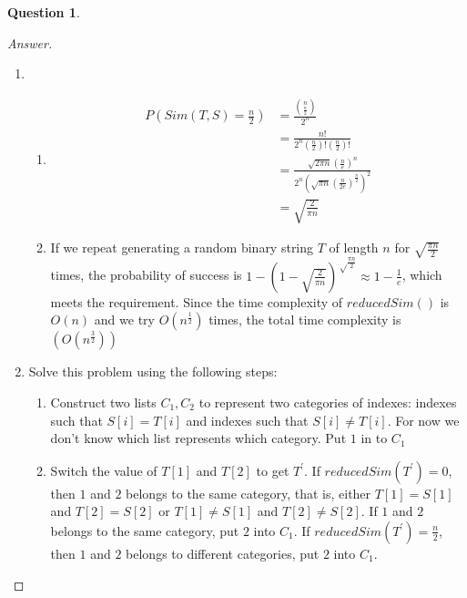 \documentclass{article}
\theoremstyle{plain}
\newtheorem{question}{Question}
\newenvironment{answer}[1][Answer]
    {\begin{proof}[#1]{$ $}\renewcommand\qedsymbol{$\vartriangle$}}
    {\end{proof}}
\begin{document}
\begin{question}
\end{question}
\begin{answer}
    \begin{enumerate}
        \item
        \begin{enumerate}
            \item
            \begin{equation*}
                \begin{aligned}
                    P\left(Sim(T, S)= \frac{n}{2}\right) &= \frac{\binom{n}{\frac{n}{2}}}{2^n} \\
                    &= \frac{n!}{2^n (\frac{n}{2})!(\frac{n}{2})!} \\
                    &= \frac{\sqrt{2 \pi n} (\frac{n}{e})^n}{2^n \left(\sqrt{\pi n} (\frac{n}{2e})^\frac{n}{2}\right)^2} \\
                    &= \sqrt{\frac{2}{\pi n}}
                \end{aligned}
            \end{equation*}
            \item
            If we repeat generating a random binary string $T$ of length $n$ for $\displaystyle\sqrt{\frac{\pi n}{2}}$ times, the probability of success is $\displaystyle 1-\left(1-\sqrt{\frac{2}{\pi n}}\right)^{\displaystyle\sqrt\frac{\pi n}{2}} \approx 1 - \frac{1}{e}$, which meets the requirement. Since the time complexity of $reducedSim()$ is $O(n)$ and we try $\displaystyle O(n^{\frac{1}{2}})$ times, the total time complexity is $\displaystyle(O(n^{\frac{3}{2}}))$
        \end{enumerate}
        \item
        Solve this problem using the following steps:
        \begin{enumerate}
            \item
            Construct two lists $C_1, C_2$ to represent two categories of indexes: indexes such that $S[i] = T[i]$ and indexes such that $S[i] \neq T[i]$. For now we don't know which list represents which category. Put $1$ in to $C_1$
            \item
            Switch the value of $T[1]$ and $T[2]$ to get $T^\prime$. If $reducedSim(T^\prime) = 0$, then $1$ and $2$ belongs to the same category, that is, either $T[1] = S[1]$ and $T[2] = S[2]$ or $T[1] \neq S[1]$ and $T[2] \neq S[2]$. If $1$ and $2$ belongs to the same category, put $2$ into $C_1$. If $\displaystyle reducedSim(T^\prime) = \frac{n}{2}$, then $1$ and $2$ belongs to different categories, put $2$ into $C_1$.

\end{enumerate}
\end{enumerate}
\end{answer}
\end{document}

